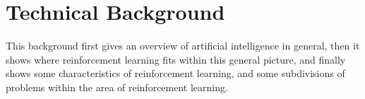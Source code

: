 \chapter{Technical Background}
This background first gives an overview of artificial intelligence in general, then it shows where reinforcement learning fits within this general picture, and finally shows some characteristics of reinforcement learning, and some subdivisions of problems within the area of reinforcement learning.












